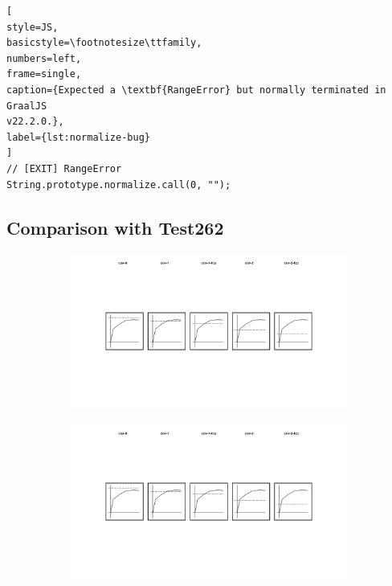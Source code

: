 \begin{lstlisting}[
style=JS,
basicstyle=\footnotesize\ttfamily,
numbers=left,
frame=single,
caption={Expected a \textbf{RangeError} but normally terminated in GraalJS
v22.2.0.},
label={lst:normalize-bug}
]
// [EXIT] RangeError
String.prototype.normalize.call(0, "");
\end{lstlisting}


\subsection{Comparison with Test262}\label{sec:compare-test262}

\begin{figure}
  \centering
  \begin{subfigure}{0.19\textwidth}
    \centering
    \includegraphics[width=\textwidth]{img/cov-0}
  \end{subfigure}
  \begin{subfigure}{0.19\textwidth}
    \centering
    \includegraphics[width=\textwidth]{img/cov-1}

\end{subfigure}
\end{figure}
